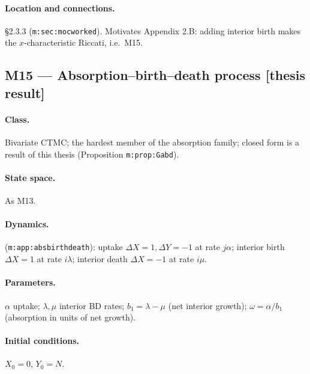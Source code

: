 \documentclass[11pt,a4paper]{article}
\begin{document}
\paragraph{Location and connections.} \S2.3.3 (\texttt{m:sec:mocworked}).
Motivates Appendix 2.B: adding interior birth makes the $x$-characteristic
Riccati, i.e.\ M15.

\subsection{M15 --- Absorption--birth--death process [thesis result]}

\paragraph{Class.} Bivariate CTMC; the hardest member of the absorption
family; closed form is a result of this thesis (Proposition
\texttt{m:prop:Gabd}).

\paragraph{State space.} As M13.

\paragraph{Dynamics.} (\texttt{m:app:absbirthdeath}): uptake
$\Delta X=1,\Delta Y=-1$ at rate $j\alpha$; interior birth $\Delta X=1$ at
rate $i\lambda$; interior death $\Delta X=-1$ at rate $i\mu$.

\paragraph{Parameters.} $\alpha$ uptake; $\lambda,\mu$ interior BD rates;
$b_1=\lambda-\mu$ (net interior growth); $\omega=\alpha/b_1$ (absorption in
units of net growth).

\paragraph{Initial conditions.} $X_0=0$, $Y_0=N$.
\end{document}
